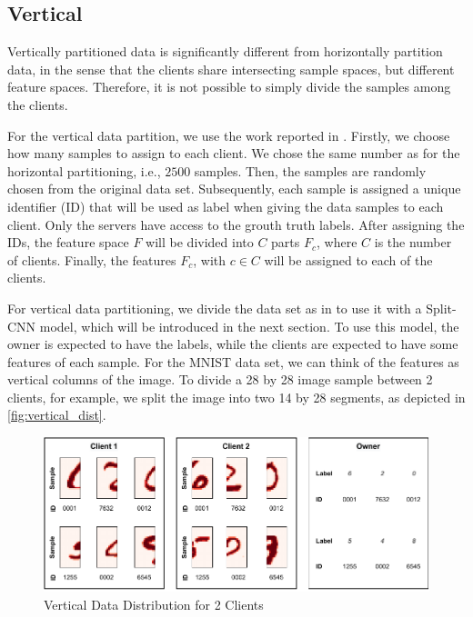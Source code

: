 \subsection{Vertical}\label{subsection:verticalpartitioning}

Vertically partitioned data is significantly different from horizontally partition data, in the sense that the clients share intersecting sample spaces, but different feature spaces. Therefore, it is not possible to simply divide the samples among the clients.

For the vertical data partition, we use the work reported in \cite{10.48550/arxiv.2104.00489}. Firstly, we choose how many samples to assign to each client. We chose the same number as for the horizontal partitioning, i.e., $2500$ samples. Then, the samples are randomly chosen from the original data set. Subsequently, each sample is assigned a unique identifier (ID) that will be used as label when giving the data samples to each client. Only the servers have access to the grouth truth labels. After assigning the IDs, the feature space $F$ will be divided into $C$ parts $F_c$, where $C$ is the number of clients. Finally, the features $F_c$, with $c \in C$ will be assigned to each of the clients.

For vertical data partitioning, we divide the data set as in \cite{10.48550/arxiv.2104.00489} to use it with a Split-CNN \cite{10.1145/3297858.3304038} model, which will be introduced in the next section. To use this model, the owner is expected to have the labels, while the clients are expected to have some features of each sample. For the MNIST data set, we can think of the features as vertical columns of the image. To divide a 28 by 28 image sample between 2 clients, for example, we split the image into two 14 by 28 segments, as depicted in \autoref{fig:vertical_dist}.

\begin{figure}[!ht]
    \centering
    \centering
    \includegraphics[width=1\textwidth]{graphics/vertical_partitioning.pdf}
    \caption{Vertical Data Distribution for 2 Clients}
    \label{fig:vertical_dist}
\end{figure}

